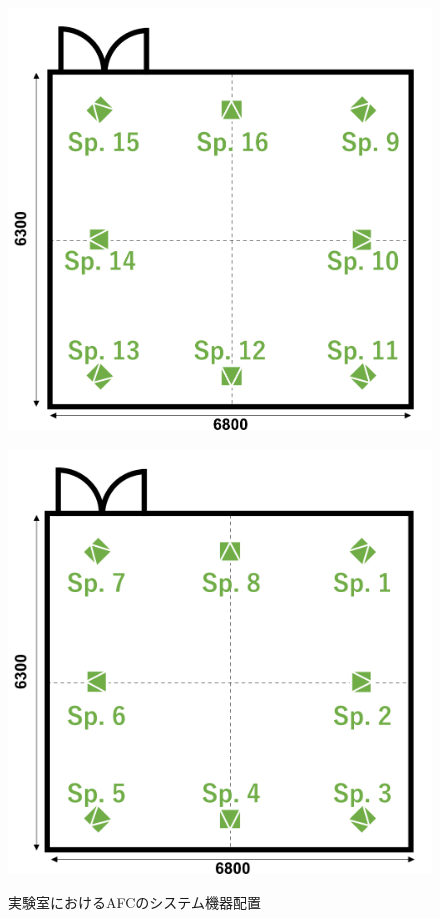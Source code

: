 \documentclass[11pt,a4j]{jreport}
\begin{document}
\begin{figure}[H]
      \begin{minipage}[b]{0.5\linewidth}
          \centering
          \includegraphics[width=.9\linewidth]{images/afcEquipArraySp2.png}
          \label{fig:スピーカー配置 二層目}
      \end{minipage}%
      \begin{minipage}[b]{0.5\linewidth}
        \centering
        \includegraphics[width=.9\linewidth]{images/afcEquipArraySp1.png}
        \label{fig:スピーカー配置 一層目}
        \vfill
      \end{minipage}
      \caption{実験室におけるAFCのシステム機器配置}
      \label{fig:実験室におけるAFCのシステム機器配置}
  \end{figure}
\end{document}
